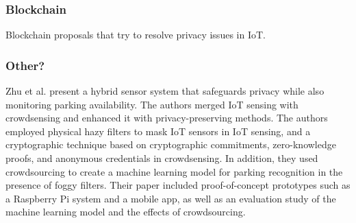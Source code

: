 \documentclass[conference]{IEEEtran}
\begin{document}



\subsubsection{Blockchain}

Blockchain proposals that try to resolve privacy issues in IoT.

\subsubsection{Other?}


Zhu et al. \cite{ZhuIntegrating} present a hybrid sensor system that safeguards
privacy while also monitoring parking availability. The authors merged IoT
sensing with crowdsensing and enhanced it with privacy-preserving methods.
The authors employed physical hazy filters to mask IoT sensors in IoT sensing,
and a cryptographic technique based on cryptographic commitments, zero-knowledge
proofs, and anonymous credentials in crowdsensing. In addition, they used crowdsourcing
to create a machine learning model for parking recognition in the
presence of foggy filters. Their paper included proof-of-concept prototypes
such as a Raspberry Pi system and a mobile app, as well as an evaluation study
of the machine learning model and the effects of crowdsourcing.
\end{document}
